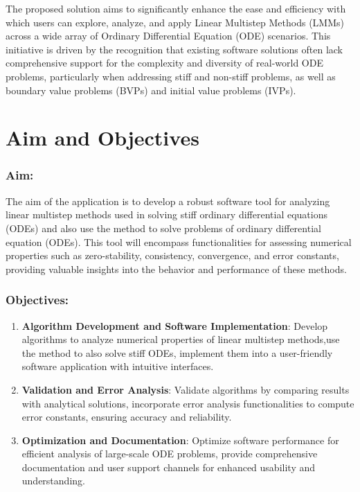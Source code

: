 The proposed solution aims to significantly enhance the ease and efficiency with which users can explore, analyze, and apply Linear Multistep Methods (LMMs) across a wide array of Ordinary Differential Equation (ODE) scenarios. This initiative is driven by the recognition that existing software solutions often lack comprehensive support for the complexity and diversity of real-world ODE problems, particularly when addressing stiff and non-stiff problems, as well as boundary value problems (BVPs) and initial value problems (IVPs).


\section{Aim and Objectives}
\subsubsection{Aim:}
The aim of the application is to develop a robust software tool for analyzing linear multistep methods used in solving stiff ordinary differential equations (ODEs) and also use the method to solve problems of ordinary differential equation (ODEs).
This tool will encompass functionalities for assessing numerical properties such as zero-stability, consistency, convergence, and error constants, providing valuable insights into the behavior and performance of these methods.
\subsubsection{Objectives:}
\begin{enumerate}
  \item \textbf{Algorithm Development and Software Implementation}: Develop algorithms to analyze numerical properties of linear multistep methods,use the method to also solve stiff ODEs, implement them into a user-friendly software application with intuitive interfaces.
    
  \item \textbf{Validation and Error Analysis}: Validate algorithms by comparing results with analytical solutions, incorporate error analysis functionalities to compute error constants, ensuring accuracy and reliability.
  
  \item \textbf{Optimization and Documentation}: Optimize software performance for efficient analysis of large-scale ODE problems, provide comprehensive documentation and user support channels for enhanced usability and understanding.

\end{enumerate}

